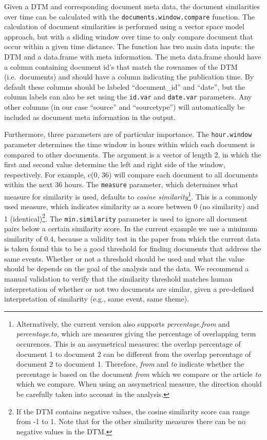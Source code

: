\documentclass[]{article}
\let\rmarkdownfootnote\footnote%
\def\footnote{\protect\rmarkdownfootnote}
\begin{document}
Given a DTM and corresponding document meta data, the document
similarities over time can be calculated with the
\texttt{documents.window.compare} function. The calculation of document
similarities is performed using a vector space model
\citep{salton75, salton03} approach, but with a sliding window over time
to only compare document that occur within a given time distance. The
function has two main data inputs: the DTM and a data.frame with meta
information. The meta data.frame should have a column containing
document id's that match the rownames of the DTM (i.e.~documents) and
should have a column indicating the publication time. By default these
columns should be labeled ``document\_id'' and ``date'', but the column
labels can also be set using the \texttt{id.var} and \texttt{date.var}
parameters. Any other columns (in our case ``source'' and
``sourcetype'') will automatically be included as document meta
information in the output.

Furthermore, three parameters are of particular importance. The
\texttt{hour.window} parameter determines the time window in hours
within which each document is compared to other documents. The argument
is a vector of length 2, in which the first and second value determine
the left and right side of the window, respectively. For example, c(0,
36) will compare each document to all documents within the next 36
hours. The \texttt{measure} parameter, which determines what measure for
similarity is used, defaults to \emph{cosine similarity}\footnote{Alternatively,
  the current version also supports \emph{percentage.from} and
  \emph{percentage.to}, which are measures giving the percentage of
  overlapping term occurences. This is an assymetrical measures: the
  overlap percentage of document 1 to document 2 can be different from
  the overlap percentage of document 2 to document 1. Therefore,
  \emph{from} and \emph{to} indicate whether the percentage is based on
  the document \emph{from} which we compare or the article \emph{to}
  which we compare. When using an assymetrical measure, the direction
  should be carefully taken into account in the analysis.}. This is a
commonly used measure, which indicates similarity as a score between 0
(no similarity) and 1 (identical)\footnote{If the DTM contains negative
  values, the cosine similarity score can range from -1 to 1. Note that
  for the other similarity measures there can be no negative values in
  the DTM.}. The \texttt{min.similarity} parameter is used to ignore all
document pairs below a certain similarity score. In the current example
we use a minimum similarity of 0.4, because a validity test in the paper
from which the current data is taken found this to be a good threshold
for finding documents that address the same events. Whether or not a
threshold should be used and what the value should be depends on the
goal of the analysis and the data. We recommend a manual validation to
verify that the similarity threshold matches human interpretation of
whether or not two documents are similar, given a pre-defined
interpretation of similarity (e.g., same event, same theme).
\end{document}
